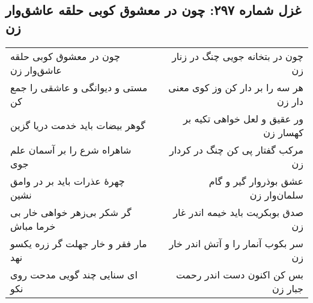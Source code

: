 \begin{center}
\section*{غزل شماره ۲۹۷: چون در معشوق کوبی حلقه عاشق‌وار زن}
\label{sec:297}
\begin{longtable}{l p{0.5cm} r}
چون در معشوق کوبی حلقه عاشق‌وار زن
&&
چون در بتخانه جویی چنگ در زنار زن
\\
مستی و دیوانگی و عاشقی را جمع کن
&&
هر سه را بر دار کن وز کوی معنی دار زن
\\
گوهر بیضات باید خدمت دریا گزین
&&
ور عقیق و لعل خواهی تکیه بر کهسار زن
\\
شاهراه شرع را بر آسمان علم جوی
&&
مرکب گفتار پی کن چنگ در کردار زن
\\
چهرهٔ عذرات باید بر در وامق نشین
&&
عشق بوذروار گیر و گام سلمان‌وار زن
\\
گر شکر بی‌زهر خواهی خار بی خرما مباش
&&
صدق بوبکریت باید خیمه اندر غار زن
\\
مار فقر و خار جهلت گر زره یکسو نهد
&&
سر بکوب آنمار را و آتش اندر خار زن
\\
ای سنایی چند گویی مدحت روی نکو
&&
بس کن اکنون دست اندر رحمت جبار زن
\\
\end{longtable}
\end{center}
